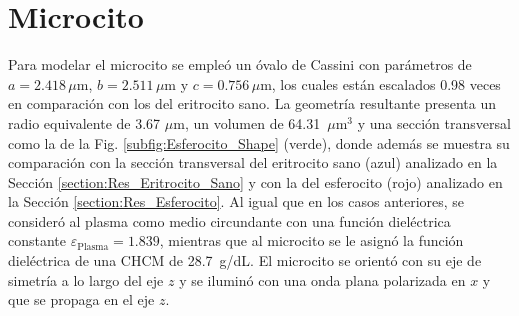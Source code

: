 
\section{Microcito}
\label{section:Res_Microcito}

Para modelar el microcito se empleó un óvalo de Cassini con parámetros de $a=2.418\,\mu\text{m}$, $b=2.511\,\mu\text{m}$ y $c=0.756\,\mu\text{m}$, los cuales están escalados 0.98 veces en comparación con los del eritrocito sano. La geometría resultante presenta un radio equivalente de 3.67 $\mu$m, un volumen de 64.31~$\mu\text{m}^3$ y una sección transversal como la de la Fig. \ref{subfig:Esferocito_Shape} (verde), donde además se muestra su comparación con la sección transversal del eritrocito sano (azul) analizado en la Sección \ref{section:Res_Eritrocito_Sano} y con la del esferocito (rojo) analizado en la Sección \ref{section:Res_Esferocito}. Al igual que en los casos anteriores, se consideró al plasma como medio circundante con una función dieléctrica constante $\varepsilon_{\text{Plasma}}=1.839$, mientras que al microcito se le asignó la función dieléctrica de una CHCM de 28.7~g/dL. El microcito se orientó con su eje de simetría a lo largo del eje $z$ y se iluminó con una onda plana polarizada en $x$ y que se propaga en el eje $z$.

